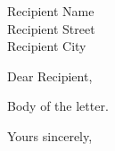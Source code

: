 \documentclass{letter}
\begin{document}
\begin{letter}{Recipient Name \\ Recipient Street \\ Recipient City}
\opening{Dear Recipient,}

Body of the letter.

\closing{Yours sincerely,}

\end{letter}
\end{document}
